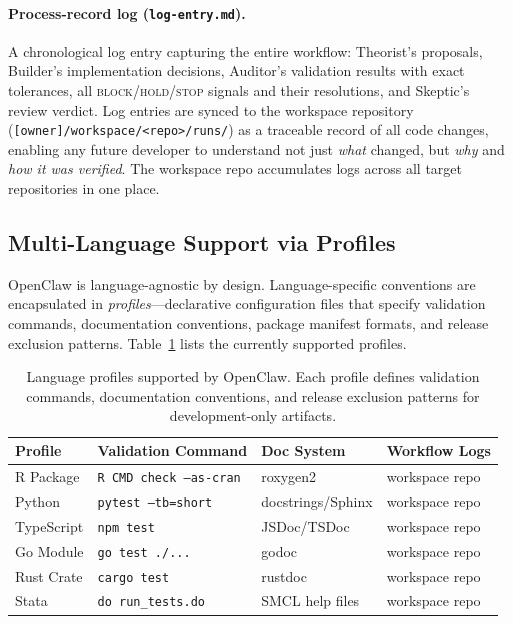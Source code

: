 \paragraph{Process-record log (\texttt{log-entry.md}).}
A chronological log entry capturing the entire workflow: Theorist's
proposals, Builder's implementation decisions, Auditor's validation
results with exact tolerances, all \textsc{block}/\textsc{hold}/\textsc{stop}
signals and their resolutions, and Skeptic's review verdict. Log
entries are synced to the workspace repository
(\texttt{[owner]/workspace/<repo>/runs/}) as a traceable record of
all code changes, enabling any future developer to understand not
just \emph{what} changed, but \emph{why} and \emph{how it was
verified}. The workspace repo accumulates logs across all target
repositories in one place.


\subsection{Multi-Language Support via Profiles}
\label{sec:profiles}

OpenClaw is language-agnostic by design. Language-specific conventions
are encapsulated in \emph{profiles}---declarative configuration files
that specify validation commands, documentation conventions, package
manifest formats, and release exclusion patterns.
Table~\ref{tab:profiles} lists the currently supported profiles.

\begin{table}[!t]
\centering
\caption{%
  Language profiles supported by OpenClaw. Each profile defines
  validation commands, documentation conventions, and release
  exclusion patterns for development-only artifacts.
}
\label{tab:profiles}
\small
\begin{tabular}{@{}llll@{}}
\toprule
\textbf{Profile} & \textbf{Validation Command} &
  \textbf{Doc System} & \textbf{Workflow Logs} \\
\midrule
R Package     & \texttt{R CMD check --as-cran}  & roxygen2
  & workspace repo \\
Python        & \texttt{pytest --tb=short}      & docstrings/Sphinx
  & workspace repo \\
TypeScript    & \texttt{npm test}               & JSDoc/TSDoc
  & workspace repo \\
Go Module     & \texttt{go test ./...}          & godoc
  & workspace repo \\
Rust Crate    & \texttt{cargo test}             & rustdoc
  & workspace repo \\
Stata         & \texttt{do run\_tests.do}       & SMCL help files
  & workspace repo \\
\bottomrule
\end{tabular}
\end{table}


